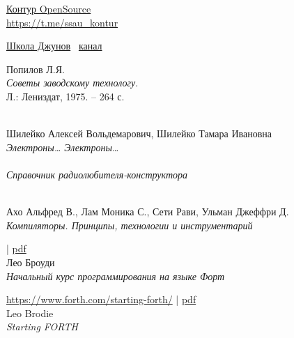 \clearpage
\renewcommand{\bibname}{Ссылки и книги}
\addcontentsline{toc}{chapter}{\bibname}
\begin{thebibliography}{}

	\href{https://www.youtube.com/playlist?list=PLddc343N7Yqi3Uoj0gk0d-2C2ifhcnQ7Y}{Контур OpenSource}
    \youtube\\
    \url{https://t.me/ssau_kontur}

    \href{https://t.me/joinchat/ARrWrxep1SBlZGIy}{Школа Джунов}
    \youtube\ \href{https://www.youtube.com/playlist?list=PLTwn6lXwNU0efZnhTCtM4O8LeToX7oq2O}{канал}

 
    Попилов Л.Я.\\
    \emph{Советы заводскому технологу}.\\
    Л.: Лениздат, 1975. – 264 с.

 
    \\
    Шилейко Алексей Вольдемарович, Шилейко Тамара Ивановна\\
    \emph{Электроны… Электроны…}\\

 
    \\
    \emph{Справочник радиолюбителя-конструктора}

 
    \\
    Ахо Альфред В., Лам Моника С., Сети Рави, Ульман Джеффри Д.\\
    \emph{Компиляторы. Принципы, технологии и инструментарий}

 
    | \href{http://www.nncron.ru/download/sf.pdf}{pdf}\\
    Лео Броуди\\
    \emph{Начальный курс программирования на языке Форт}

 
    \url{https://www.forth.com/starting-forth/}
    | \href{https://github.com/ponyatov/RDW/releases/download/051021-544b/Starting-FORTH.pdf}{pdf}\\
    Leo Brodie\\
    \emph{Starting FORTH}


\end{thebibliography}
